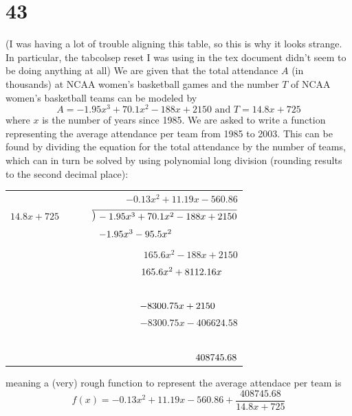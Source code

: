 \documentclass{article}
\newcommand\Mydiv[1]{%
\smash{\raise.3ex\hbox{$\big)$}}\mkern-8mu
        \overline{\enspace\strut#1}}
\theoremstyle{definition}
\begin{document}
\section*{43}
\setlength{\tabcolsep}{1pt}
(I was having a lot of trouble aligning this table, so this is why it looks strange. In particular, the tabcolsep reset I was using in the tex document 
didn't seem to be doing anything at all)\newline
We are given that the total attendance $A$ (in thousands) at NCAA women's basketball games and the number $T$ of NCAA women's basketball teams can 
be modeled by \[ A=-1.95x^3+70.1x^2-188x+2150\textrm{ and } T=14.8x+725 \] where $x$ is the number of years since 1985. We are asked to write a function 
representing the average attendance per team from 1985 to 2003. This can be found by dividing the equation for the total attendance by the number of teams,
which can in turn be solved by using polynomial long division (rounding results to the second decimal place):
\FloatBarrier
	\begin{center}
		\begin{tabular}{lr}
			& $-0.13x^2+11.19x-560.86$ \\
			$14.8x+725$ & $\Mydiv{-1.95x^3+70.1x^2-188x+2150}$ \\[4pt]
			& $-1.95x^3-95.5x^2\hphantom{.-188x+2150}$ \\[-8pt]
			& \hrulefill\hphantom{-188x+2150}\\[4pt]
			& $165.6x^2-188x+2150$\\[4pt]
			& $165.6x^2+8112.16x\hphantom{8.+}$\\[-8pt]
			& $\hphantom{-1.95x^30.95x^3-}\hrulefill\hphantom{8.+}$\\[4pt]
			& $-8300.75x+2150\hphantom{-830}$\\[4pt]
			& $-8300.75x-406624.58$\\[-8pt]
			& $\hphantom{1.95x^3-165.6x^2}\hrulefill$\\[4pt]
			& $\hphantom{-1.95x^3-165.6x^2-8300.16x}408745.68$
		\end{tabular}
	\end{center}
\FloatBarrier
meaning a (very) rough function to represent the average attendace per team is
\[ f(x)=-0.13x^2+11.19x-560.86+\dfrac{408745.68}{14.8x+725} \]
	
\newpage
\setlength{\tabcolsep}{10pt}
\end{document}
